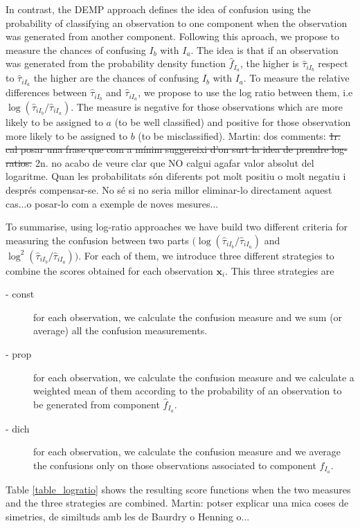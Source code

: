 \documentclass[10pt, a4paper]{article}
\newcommand{\m}[1]{\boldsymbol{#1}}
\begin{document}
\begin{spacing}{1.9}
In contrast, the DEMP approach defines the idea of confusion using the probability of classifying an observation to one component when the observation was generated from another component. Following this aproach, we propose to measure the chances of confusing $I_b$ with $I_a$. The idea is that if an observation was generated from the probability density function $\hat{f}_{I_a}$, the higher is $\hat{\tau}_{i I_b}$ respect to $\hat{\tau}_{i I_a}$ the higher are the chances of confusing $I_b$ with $I_a$. To measure the relative differences between  $\hat{\tau}_{i I_b}$ and $\hat{\tau}_{i I_a}$, we propose to use the log ratio between them, i.e $\log( \hat{\tau}_{i I_b}/\hat{\tau}_{i I_a})$. The measure is negative for those observations which are more likely to be assigned to $a$ (to be well classified) and positive for those observation more likely to be assigned to $b$ (to be misclassified). {\color{blue} Martin: dos comments: \sout{1r. cal posar una frase que com a mínim suggereixi d'on surt la idea de prendre log-ratios.} 2n. no acabo de veure clar que NO calgui agafar valor absolut del logaritme. Quan  les probabilitats són diferents pot molt positiu o molt negatiu i després compensar-se. No sé si no seria millor eliminar-lo directament aquest cas...o posar-lo com a exemple de noves mesures...}

To summarise, using log-ratio approaches we have build two different criteria for measuring the confusion between two parts $(\log ( \hat{\tau}_{iI_b} / \hat{\tau}_{iI_a}) $ and $\log^2 (\hat{\tau}_{iI_b} / \hat{\tau}_{iI_a} ))$. For each of them, we introduce three different strategies to combine the scores obtained for each observation $\m x_i$. This three strategies are
\begin{description}
\item[- const] for each observation, we calculate the confusion measure and we sum (or average) all the confusion measurements.
\item[- prop] for each observation, we calculate the confusion measure and we calculate a weighted mean of them according to the probability of an observation to be generated from component $\hat{f}_{I_a}$.
\item[- dich] for each observation, we calculate the confusion measure and we average the confusions only on those observations associated to component $\hat{f}_{I_a}$.
\end{description}

Table \ref{table_logratio} shows the resulting score functions when the two measures and the three strategies are combined. {\color{blue} Martin: potser explicar una mica coses de simetries, de similtuds amb les de Baurdry o Henning o...}


\end{spacing}
\end{document}
